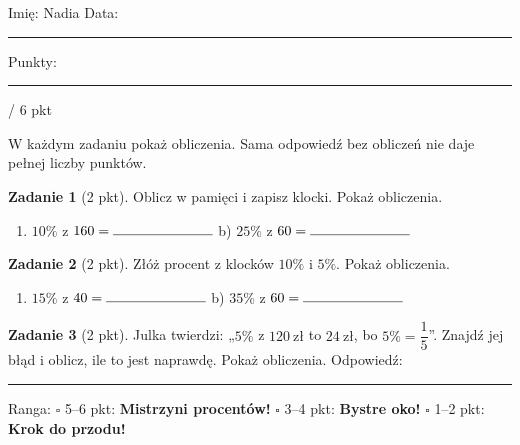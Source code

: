\documentclass[11pt,a4paper]{article}
\begin{document}

\vspace{0.2em}
Imię: Nadia \hfill Data: \rule{3cm}{0.4pt} \hfill Punkty: \rule{1.2cm}{0.4pt} / 6 pkt

{\small W każdym zadaniu pokaż obliczenia. Sama odpowiedź bez obliczeń nie daje pełnej liczby punktów.}

\vspace{0.4em}

\textbf{Zadanie 1} (2 pkt). Oblicz w pamięci i zapisz klocki. Pokaż obliczenia.
\begin{enumerate}[label=\alph*), leftmargin=*, itemsep=2pt]
  \item $10\%$ z $160 = \rule{2.5cm}{0.4pt}$ \hspace{1cm} b) $25\%$ z $60 = \rule{2.5cm}{0.4pt}$
\end{enumerate}
\miejsce{4cm}

\textbf{Zadanie 2} (2 pkt). Złóż procent z klocków $10\%$ i $5\%$. Pokaż obliczenia.
\begin{enumerate}[label=\alph*), leftmargin=*, itemsep=2pt]
  \item $15\%$ z $40 = \rule{2.5cm}{0.4pt}$ \hspace{1cm} b) $35\%$ z $60 = \rule{2.5cm}{0.4pt}$
\end{enumerate}
\miejsce{4.5cm}

\textbf{Zadanie 3} (2 pkt). Julka twierdzi: „$5\%$ z $120\ \text{zł}$ to $24\ \text{zł}$, bo $5\%=\dfrac{1}{5}$”. Znajdź jej błąd i oblicz, ile to jest naprawdę. Pokaż obliczenia.
\miejsce{5cm}
Odpowiedź: \rule{4cm}{0.4pt}

\vfill
\begin{tcolorbox}[colback=white, colframe=cel, boxrule=0.6pt, arc=2pt]
Ranga: \quad $\square$ 5--6 pkt: \textbf{Mistrzyni procentów!} \quad $\square$ 3--4 pkt: \textbf{Bystre oko!} \quad $\square$ 1--2 pkt: \textbf{Krok do przodu!}
\end{tcolorbox}
\end{document}
